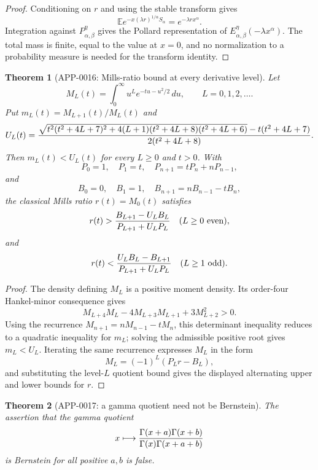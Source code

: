 \documentclass[11pt]{article}
\numberwithin{equation}{section}
\newtheorem{theorem}{Theorem}[section]
\theoremstyle{definition}
\theoremstyle{remark}
\newcommand{\1}{\mathbf 1}
\begin{document}
\begin{proof}
Conditioning on \(r\) and using the stable transform gives
\[
 \mathbb E e^{-x(\lambda r)^{1/\alpha}S_\alpha}=e^{-\lambda r x^\alpha}.
\]
Integration against \(P_{\alpha,\beta}^{\eta}\) gives the Pollard
representation of \(E_{\alpha,\beta}^{\eta}(-\lambda x^\alpha)\).  The total
mass is finite, equal to the value at \(x=0\), and no normalization to a
probability measure is needed for the transform identity.
\end{proof}

\begin{theorem}[APP-0016: Mills-ratio bound at every derivative level]
\label{thm:app16-mills-all-l}
Let
\[
  M_L(t)=\int_0^\infty u^L e^{-tu-u^2/2}\,du,\qquad L=0,1,2,\ldots .
\]
Put \(m_L(t)=M_{L+1}(t)/M_L(t)\) and
\[
 U_L(t)=
 {\sqrt{t^2(t^2+4L+7)^2+4(L+1)(t^2+4L+8)(t^2+4L+6)}
       -t(t^2+4L+7)
  \over 2(t^2+4L+8)} .
\]
Then \(m_L(t)<U_L(t)\) for every \(L\ge0\) and \(t>0\).  With
\[
P_0=1,\quad P_1=t,\quad P_{n+1}=tP_n+nP_{n-1},
\]
and
\[
B_0=0,\quad B_1=1,\quad B_{n+1}=nB_{n-1}-tB_n,
\]
the classical Mills ratio \(r(t)=M_0(t)\) satisfies
\[
 r(t)>{B_{L+1}-U_LB_L\over P_{L+1}+U_LP_L}\quad(L\ge0\ {\rm even}),
\]
and
\[
 r(t)<{U_LB_L-B_{L+1}\over P_{L+1}+U_LP_L}\quad(L\ge1\ {\rm odd}).
\]
\end{theorem}

\begin{proof}
The density defining \(M_L\) is a positive moment density.  Its order-four
Hankel-minor consequence gives
\[
M_{L+4}M_L-4M_{L+3}M_{L+1}+3M_{L+2}^2>0.
\]
Using the recurrence \(M_{n+1}=nM_{n-1}-tM_n\), this determinant inequality
reduces to a quadratic inequality for \(m_L\); solving the admissible positive
root gives \(m_L<U_L\).  Iterating the same recurrence expresses \(M_L\) in the
form
\[
M_L=(-1)^L(P_L r-B_L),
\]
and substituting the level-\(L\) quotient bound gives the displayed alternating
upper and lower bounds for \(r\).
\end{proof}

\begin{theorem}[APP-0017: a gamma quotient need not be Bernstein]
\label{thm:app17-baricz-counterexample}
The assertion that the gamma quotient
\[
 x\longmapsto {\Gamma(x+a)\Gamma(x+b)\over \Gamma(x)\Gamma(x+a+b)}
\]
is Bernstein for all positive \(a,b\) is false.
\end{theorem}
\end{document}
